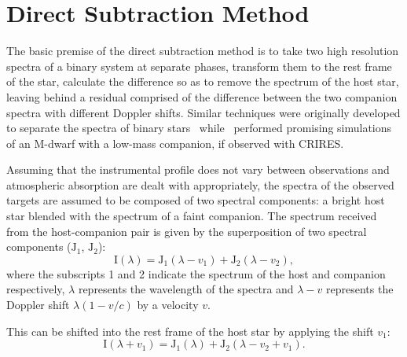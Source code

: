 
\section{Direct Subtraction Method}
\label{sec:direct-subtraction}
The basic premise of the direct subtraction method is to take two high resolution spectra of a binary system at separate phases, transform them to the rest frame of the star, calculate the difference so as to remove the spectrum of the host star, leaving behind a residual comprised of the difference between the two companion spectra with different Doppler shifts.
Similar techniques were originally developed to separate the spectra of binary stars~\citep[e.g.][]{ferluga_separating_1997} while~\citet{kostogryz_spectral_2013} performed promising simulations of an {M-dwarf} with a low-mass companion, if observed with {CRIRES}.

Assuming that the instrumental profile does not vary between observations and atmospheric absorption are dealt with appropriately, the spectra of the observed targets are assumed to be composed of two spectral components: a bright host star blended with the spectrum of a faint companion.
The spectrum received from the host-companion pair is given by the superposition of two spectral components (\(\textrm{J}_{1}\), \(\textrm{J}_{2}\)):
\begin{equation}
\textrm{I}(\lambda) = \textrm{J}_{1}(\lambda - v_{1}) + \textrm{J}_{2}(\lambda - v_{2}),
\end{equation}
where the subscripts 1 and 2 indicate the spectrum of the host and companion respectively, \(\lambda\) represents the wavelength of the spectra and \(\lambda-v\) represents the Doppler shift \(\lambda(1-v/c)\) by a velocity \(v\).

This can be shifted into the rest frame of the host star by applying the shift \(v_1\):
\begin{equation}
\textrm{I}(\lambda + v_{1}) = \textrm{J}_{1}(\lambda) + \textrm{J}_{2}(\lambda - v_{2} + v_{1}).
\end{equation}

